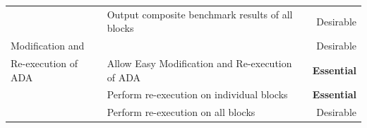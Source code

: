 \documentclass[twoside]{article}
\begin{document}
\begin{table}[H]
\begin{tabular}{llr}
                                                			& Output composite benchmark results of all blocks           & Desirable		\\
Modification and 					&                                                             				& Desirable     		\\
Re-execution of ADA             			& Allow Easy Modification and Re-execution of ADA          & \textbf{Essential}	\\
                                                			& Perform re-execution on individual blocks                   	& \textbf{Essential} 	\\
                                                			& Perform re-execution on all blocks                          		& Desirable 		\\


\bottomrule
\end{tabular}
\end{table}
\end{document}

